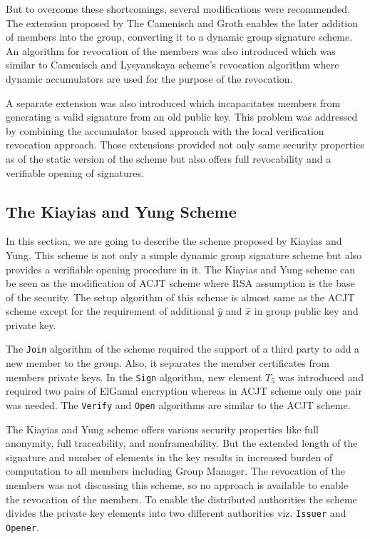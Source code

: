 But to overcome these shortcomings, several modifications were recommended. The extension proposed by The Camenisch and Groth enables the later addition of members into the group, converting it to a dynamic group signature scheme. An algorithm for revocation of the members was also introduced which was similar to Camenisch and Lysyanskaya scheme's revocation algorithm where dynamic accumulators are used for the purpose of the revocation\cite{camenisch2002dynamic}. 

A separate extension was also introduced which incapacitates members from generating a valid signature from an old public key. This problem was addressed by combining the accumulator based approach with the local verification revocation approach. Those extensions provided not only same security properties as of the static version of the scheme but also offers full revocability and a verifiable opening of signatures.

\subsection{The Kiayias and Yung Scheme}\label{KY}
In this section, we are going to describe the scheme proposed by Kiayias and Yung\cite{kiayias2005efficient}\cite{kiayias2006secure}. This scheme is not only a simple dynamic group signature scheme but also provides a verifiable opening procedure in it. The Kiayias and Yung scheme can be seen as the modification of ACJT scheme where RSA assumption is the base of the security. The setup algorithm of this scheme is almost same as the ACJT scheme except for the requirement of additional $\hat{y}$ and $\hat{x}$ in group public key and private key.

The \texttt{Join} algorithm of the scheme required the support of a third party to add a new member to the group. Also, it separates the member certificates from members private keys. In the \texttt{Sign} algorithm, new element $T_5$ was introduced and required two pairs of ElGamal encryption whereas in ACJT scheme only one pair was needed. The \texttt{Verify} and \texttt{Open} algorithms are similar to the ACJT scheme. 

The Kiayias and Yung scheme offers various security properties like full anonymity, full traceability, and nonframeability. But the extended length of the signature and number of elements in the key results in increased burden of computation to all members including Group Manager. The revocation of the members was not discussing this scheme, so no approach is available to enable the revocation of the members. To enable the distributed authorities the scheme divides the private key elements into two different authorities viz. \texttt{Issuer} and \texttt{Opener}.

